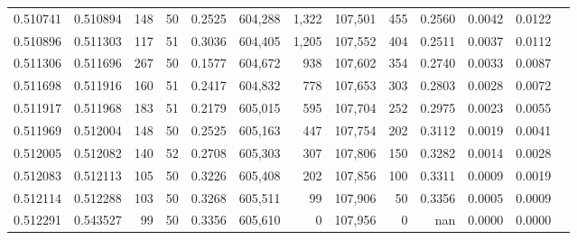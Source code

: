 \begin{tabular}{rrrrrrrrrrrrr}
0.510741 & 0.510894 & 148 &  50 &                                     0.2525 & 604,288 &   1,322 & 107,501 &     455 & 0.2560 & 0.0042 & 0.0122 \\
0.510896 & 0.511303 & 117 &  51 &                                     0.3036 & 604,405 &   1,205 & 107,552 &     404 & 0.2511 & 0.0037 & 0.0112 \\
0.511306 & 0.511696 & 267 &  50 &                                     0.1577 & 604,672 &     938 & 107,602 &     354 & 0.2740 & 0.0033 & 0.0087 \\
0.511698 & 0.511916 & 160 &  51 &                                     0.2417 & 604,832 &     778 & 107,653 &     303 & 0.2803 & 0.0028 & 0.0072 \\
0.511917 & 0.511968 & 183 &  51 &                                     0.2179 & 605,015 &     595 & 107,704 &     252 & 0.2975 & 0.0023 & 0.0055 \\
0.511969 & 0.512004 & 148 &  50 &                                     0.2525 & 605,163 &     447 & 107,754 &     202 & 0.3112 & 0.0019 & 0.0041 \\
0.512005 & 0.512082 & 140 &  52 &                                     0.2708 & 605,303 &     307 & 107,806 &     150 & 0.3282 & 0.0014 & 0.0028 \\
0.512083 & 0.512113 & 105 &  50 &                                     0.3226 & 605,408 &     202 & 107,856 &     100 & 0.3311 & 0.0009 & 0.0019 \\
0.512114 & 0.512288 & 103 &  50 &                                     0.3268 & 605,511 &      99 & 107,906 &      50 & 0.3356 & 0.0005 & 0.0009 \\
0.512291 & 0.543527 &  99 &  50 &                                     0.3356 & 605,610 &       0 & 107,956 &       0 &    nan & 0.0000 & 0.0000 \\
\bottomrule
\end{tabular}
